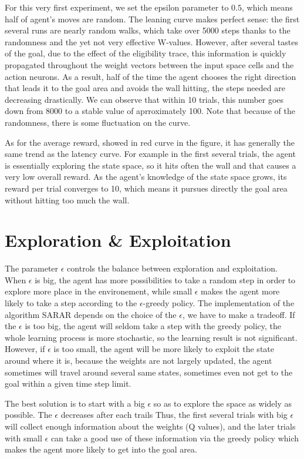 \documentclass[a4paper, 12pt]{article}
\begin{document}
For this very first experiment, we set the epsilon parameter to $0.5$,
which means half of agent's moves are random. The leaning curve makes
perfect sense: the first several runs are nearly random walks, which
take over 5000 steps thanks to the randomness and the yet not very
effective W-values. However, after several tastes of the goal, due to
the effect of the eligibility trace, this information is quickly
propagated throughout the weight vectors between the input space cells
and the action neurons. As a result, half of the time the agent
chooses the right direction that leads it to the goal area and avoids
the wall hitting, the steps needed are decreasing drastically. We can
observe that within 10 trials, this number goes down from 8000 to
a stable value of aprroximately 100. Note that because of the
randomness, there is some fluctuation on the curve.

As for the average reward, showed in red curve in the figure, it has
generally the same trend as the latency curve. For example in the
first several trials, the agent is essentially exploring the state
space, so it hits often the wall and that causes a very low overall
reward. As the agent's knowledge of the state space grows, its reward
per trial converges to 10, which means it pursues directly the goal
area without hitting too much the wall.

\section{Exploration \& Exploitation}
The parameter $\epsilon$ controls the balance between exploration and exploitation. When $\epsilon$ is big, the agent has more possibilities to take a random step in order to explore more place in the environement, while small $\epsilon$ makes the agent more likely to take a step according to the $\epsilon$-greedy policy. The implementation of the algorithm SARAR depends on the choice of the $\epsilon$, we have to make a tradeoff. If the $\epsilon$ is too big, the agent will seldom take a step with the greedy policy, the whole learning process is more stochastic, so the learning result is not significant. However, if $\epsilon$ is too small, the agent will be more likely to exploit the state around where it is, because the weights are not largely updated, the agent sometimes will travel around several same states, sometimes even not get to the goal within a given time step limit.

The best solution is to start with a big $\epsilon$ so as to explore the space as widely as possible. The $\epsilon$ decreases after each trails Thus, the first several trials with big $\epsilon$ will collect enough information about the weights (Q values), and the later trials with small $\epsilon$ can take a good use of these information via the greedy policy which makes the agent more likely to get into the goal area.
\end{document}
